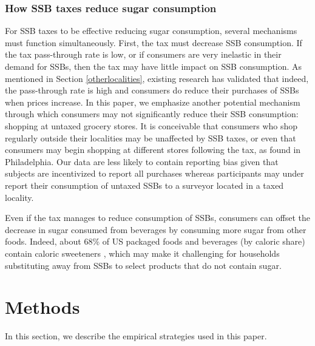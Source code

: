 \documentclass[12pt]{article}
\begin{document}
\subsubsection{How SSB taxes reduce sugar consumption}

For SSB taxes to be effective reducing sugar consumption, several mechanisms must function simultaneously. First, the tax must decrease SSB consumption. If the tax pass-through rate is low, or if consumers are very inelastic in their demand for SSBs, then the tax may have little impact on SSB consumption. As mentioned in Section \ref{otherlocalities}, existing research has validated that indeed, the pass-through rate is high and consumers do reduce their purchases of SSBs when prices increase. In this paper, we emphasize another potential mechanism through which consumers may not significantly reduce their SSB consumption: shopping at untaxed grocery stores. It is conceivable that consumers who shop regularly outside their localities may be unaffected by SSB taxes, or even that consumers may begin shopping at different stores following the tax, as \textcite{cawley2020philly} found in Philadelphia. Our data are less likely to contain reporting bias given that subjects are incentivized to report all purchases whereas participants may under report their consumption of untaxed SSBs to a surveyor located in a taxed locality.

Even if the tax manages to reduce consumption of SSBs, consumers can offset the decrease in sugar consumed from beverages by consuming more sugar from other foods. Indeed, about 68\% of US packaged foods and beverages (by caloric share) contain caloric sweeteners \parencite{popkin2016sweetening}, which may make it challenging for households substituting away from SSBs to select products that do not contain sugar.


\section{Methods} \label{methods}

In this section, we describe the empirical strategies used in this paper.

\end{document}
